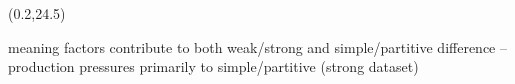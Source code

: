 \documentclass[a0,portrait]{a0poster}
\newcommand{\white}[1]{\textcolor{white}{#1}}
\def\LHead#1{\noindent{\LARGE\color{myBlue} #1}}
\begin{document}
\begin{textblock}{7}
\begin{textblock}{15}(0.2,24.5)
\large

meaning factors contribute to both weak/strong and simple/partitive difference
-- production pressures  primarily to simple/partitive (strong dataset)

\end{textblock} 

\end{textblock} 





%	


\end{document}
